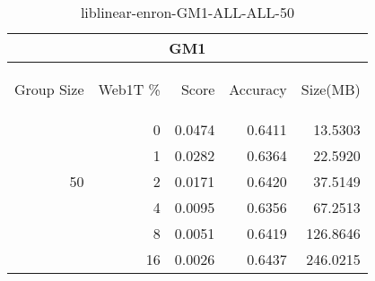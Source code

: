 \begin{center}
\begin{table}[htbp]
\begin{tabular}{ | r | r | r | r | r |}
\hline
\multicolumn{5}{|c|}{GM1}\\
\hline
\begin{sideways}Group Size\end{sideways} & \begin{sideways}Web1T \%\end{sideways} & \begin{sideways}Score\end{sideways} & \begin{sideways}Accuracy\end{sideways} & \begin{sideways}Size(MB)\end{sideways}\\
\hline
\multirow{5}{*}{50}
 & 0 & 0.0474 & 0.6411 & 13.5303\\ \cline{2-5}
 & 1 & 0.0282 & 0.6364 & 22.5920\\ \cline{2-5}
 & 2 & 0.0171 & 0.6420 & 37.5149\\ \cline{2-5}
 & 4 & 0.0095 & 0.6356 & 67.2513\\ \cline{2-5}
 & 8 & 0.0051 & 0.6419 & 126.8646\\ \cline{2-5}
 & 16 & 0.0026 & 0.6437 & 246.0215\\ \cline{2-5}
\hline
\end{tabular}
\caption{liblinear-enron-GM1-ALL-ALL-50}
\label{table:liblinear-enron-GM1-ALL-ALL-50}
\end{table}
\end{center}

